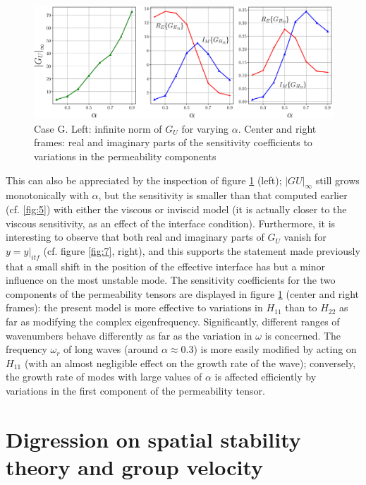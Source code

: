 \begin{figure}[h]
	\centering
	\includegraphics[width=1\linewidth]{chapter_3/figure/8}
	\caption{Case G. Left: infinite norm of $G_U$ for varying $\alpha$. Center and right frames: real and imaginary parts of the sensitivity
		coefficients to variations in the permeability components}
	\label{fig:8}
\end{figure}

This can also be appreciated by the inspection of figure \ref{fig:8} (left); $|G U |_{\infty}$ still grows monotonically with
$\alpha$, but the sensitivity is smaller than that computed earlier (cf. \ref{fig:5}) with either the viscous or
inviscid model (it is actually closer to the viscous sensitivity, as an effect of the interface condition).
Furthermore, it is interesting to observe that both real and imaginary parts of $G_U$ vanish for $y = y|_{itf}$
(cf. figure \ref{fig:7}, right), and this supports the statement made previously that a small shift in the position
of the effective interface has but a minor influence on the most unstable mode.
The sensitivity coefficients for the two components of the permeability tensors are displayed in figure 
\ref{fig:8} (center and right frames): the present model is more effective to variations in $ {H}_{11}$ than to $ {H}_{22}$
as far as modifying the complex eigenfrequency. Significantly, different ranges of wavenumbers
behave differently as far as the variation in $\omega$ is concerned. The frequency $\omega_r$ of long waves (around
$\alpha \approx 0.3$) is more easily modified by acting on $ {H}_{11}$ (with an almost negligible effect on the growth
rate of the wave); conversely, the growth rate of modes with large values of $\alpha$ is affected efficiently
by variations in the first component of the permeability tensor.





\section{Digression on spatial stability theory and group velocity}
\label{appB}

